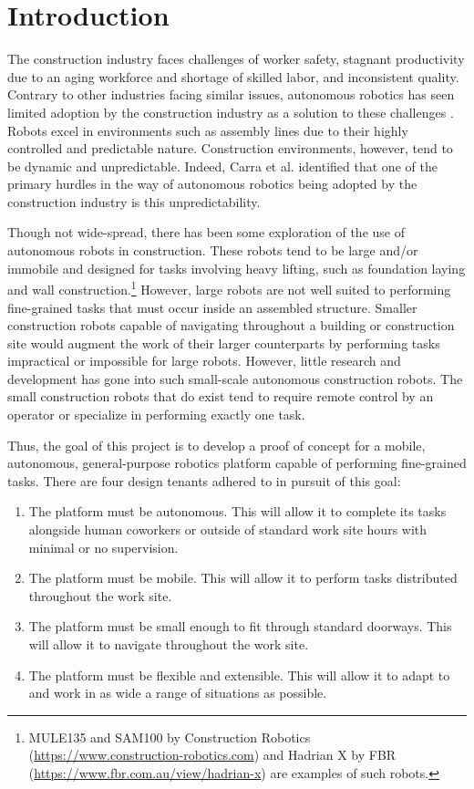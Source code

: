 \section{Introduction}
The construction industry faces challenges of worker safety, stagnant productivity due to an aging workforce and shortage of skilled labor, and inconsistent quality. Contrary to other industries facing similar issues, autonomous robotics has seen limited adoption by the construction industry as a solution to these challenges \cite{carra2018robotics,delgado2019robotics}. Robots excel in environments such as assembly lines due to their highly controlled and predictable nature. Construction environments, however, tend to be dynamic and unpredictable. Indeed, Carra et al. \cite{carra2018robotics} identified that one of the primary hurdles in the way of autonomous robotics being adopted by the construction industry is this unpredictability.

Though not wide-spread, there has been some exploration of the use of autonomous robots in construction. These robots tend to be large and/or immobile and designed for tasks involving heavy lifting, such as foundation laying and wall construction.\footnote{MULE135 and SAM100 by Construction Robotics (\href{https://www.construction-robotics.com}{https://www.construction-robotics.com}) and Hadrian X by FBR (\href{https://www.fbr.com.au/view/hadrian-x}{https://www.fbr.com.au/view/hadrian-x}) are examples of such robots.} However, large robots are not well suited to performing fine-grained tasks that must occur inside an assembled structure. Smaller construction robots capable of navigating throughout a building or construction site would augment the work of their larger counterparts by performing tasks impractical or impossible for large robots. However, little research and development has gone into such small-scale autonomous construction robots. The small construction robots that do exist tend to require remote control by an operator or specialize in performing exactly one task.

Thus, the goal of this project is to develop a proof of concept for a mobile, autonomous, general-purpose robotics platform capable of performing fine-grained tasks. There are four design tenants adhered to in pursuit of this goal:
\begin{enumerate}
    \item The platform must be autonomous. This will allow it to complete its tasks alongside human coworkers or outside of standard work site hours with minimal or no supervision.
    \item The platform must be mobile. This will allow it to perform tasks distributed throughout the work site.
    \item The platform must be small enough to fit through standard doorways. This will allow it to navigate throughout the work site.
    \item The platform must be flexible and extensible. This will allow it to adapt to and work in as wide a range of situations as possible.
\end{enumerate}

